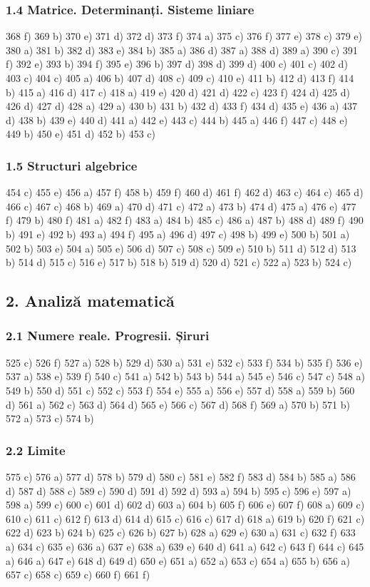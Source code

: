 \documentclass[11pt]{article}
\begin{document}
\subsubsection*{1.4 Matrice. Determinanți. Sisteme liniare}
368 f) 369 b) 370 e) 371 d) 372 d) 373 f) 374 a) 375 c) 376 f) 377 e) 378 c) 379 e) 380 a) 381 b) 382 d) 383 e) 384 b) 385 a) 386 d) 387 a) 388 d) 389 a) 390 c) 391 f) 392 e) 393 b) 394 f) 395 e) 396 b) 397 d) 398 d) 399 d) 400 c) 401 c) 402 d) 403 c) 404 c) 405 a) 406 b) 407 d) 408 c) 409 c) 410 e) 411 b) 412 d) 413 f) 414 b) 415 a) 416 d) 417 c) 418 a) 419 e) 420 d) 421 d) 422 c) 423 f) 424 d) 425 d) 426 d) 427 d) 428 a) 429 a) 430 b) 431 b) 432 d) 433 f) 434 d) 435 e) 436 a) 437 d) 438 b) 439 e) 440 d) 441 a) 442 e) 443 c) 444 b) 445 a) 446 f) 447 c) 448 e) 449 b) 450 e) 451 d) 452 b) 453 c)

\subsubsection*{1.5 Structuri algebrice}
454 c) 455 e) 456 a) 457 f) 458 b) 459 f) 460 d) 461 f) 462 d) 463 c) 464 c) 465 d) 466 c) 467 c) 468 b) 469 a) 470 d) 471 c) 472 a) 473 b) 474 d) 475 a) 476 e) 477 f) 479 b) 480 f) 481 a) 482 f) 483 a) 484 b) 485 c) 486 a) 487 b) 488 d) 489 f) 490 b) 491 e) 492 b) 493 a) 494 f) 495 a) 496 d) 497 c) 498 b) 499 e) 500 b) 501 a) 502 b) 503 e) 504 a) 505 e) 506 d) 507 c) 508 c) 509 e) 510 b) 511 d) 512 d) 513 b) 514 d) 515 c) 516 e) 517 b) 518 b) 519 d) 520 d) 521 c) 522 a) 523 b) 524 c)

\subsection*{2. Analiză matematică}
\subsubsection*{2.1 Numere reale. Progresii. Șiruri}
525 c) 526 f) 527 a) 528 b) 529 d) 530 a) 531 e) 532 c) 533 f) 534 b) 535 f) 536 e) 537 a) 538 e) 539 f) 540 c) 541 a) 542 b) 543 b) 544 a) 545 e) 546 c) 547 c) 548 a) 549 b) 550 d) 551 c) 552 c) 553 f) 554 e) 555 a) 556 e) 557 d) 558 a) 559 b) 560 d) 561 a) 562 c) 563 d) 564 d) 565 e) 566 c) 567 d) 568 f) 569 a) 570 b) 571 b) 572 a) 573 c) 574 b)

\subsubsection*{2.2 Limite}
575 c) 576 a) 577 d) 578 b) 579 d) 580 c) 581 e) 582 f) 583 d) 584 b) 585 a) 586 d) 587 d) 588 c) 589 c) 590 d) 591 d) 592 d) 593 a) 594 b) 595 c) 596 e) 597 a) 598 a) 599 c) 600 c) 601 d) 602 d) 603 a) 604 b) 605 f) 606 e) 607 f) 608 a) 609 c) 610 c) 611 c) 612 f) 613 d) 614 d) 615 c) 616 c) 617 d) 618 a) 619 b) 620 f) 621 c) 622 d) 623 b) 624 b) 625 c) 626 b) 627 b) 628 a) 629 e) 630 a) 631 c) 632 f) 633 a) 634 c) 635 e) 636 a) 637 e) 638 a) 639 e) 640 d) 641 a) 642 c) 643 f) 644 c) 645 a) 646 a) 647 e) 648 d) 649 d) 650 e) 651 a) 652 a) 653 c) 654 a) 655 b) 656 a) 657 c) 658 c) 659 c) 660 f) 661 f)
\end{document}
